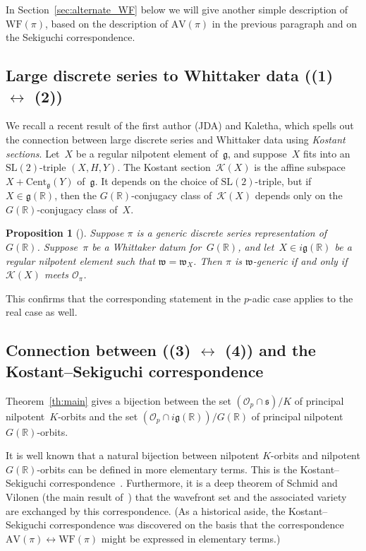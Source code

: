 \documentclass[10pt,leqno]{article}
\newtheorem{proposition}[equation]{Proposition}
\renewcommand{\O}{\mathcal O}
\newcommand{\R}{\mathbb R}
\newcommand{\g}{\mathfrak g}
\newcommand{\SL}{\text{SL}}
\newcommand{\s}{\mathfrak s}
\newcommand{\w}{\mathfrak w}
\newcommand{\AV}{\mathrm{AV}}
\newcommand{\WF}{\mathrm{WF}}
\newcommand{\Op}{\O_p}
\newcommand{\Kostant}[1]{\mathcal{K}(#1)}
\begin{document}
In Section~\ref{sec:alternate_WF} below we will  give another simple description of~$\WF(\pi)$, based on the description of $\AV(\pi)$ in the previous paragraph and on the Sekiguchi correspondence. 

\subsection{Large discrete series to Whittaker data ((1) $\leftrightarrow$ (2))}


We recall a recent result of the first author (JDA) and Kaletha, which spells out the connection between large discrete series and Whittaker data using  {\it Kostant sections}. Let~$X$ be a regular nilpotent element of~$\g$, and suppose~$X$ fits into an $\SL(2)$-triple $(X, H, Y)$. The Kostant section~$\Kostant{X}$ is the affine subspace $X + \mathrm{Cent}_{\g}(Y)$ of~$\g$. It depends on the choice of $\SL(2)$-triple, but if $X \in \g(\R)$, then the $G(\R)$-conjugacy class of~$\Kostant{X}$ depends only on the $G(\R)$-conjugacy class of~$X$. 


\begin{proposition}[\cite{adams_kaletha}]\label{JeffTasho_criterion}
Suppose $\pi$ is a generic discrete series representation of~$G(\R)$. Suppose~$\pi$ be a Whittaker datum for~$G(\R)$, and let~$X \in i\g(\R)$ be a regular nilpotent element such that $\w = \w_X$. 
Then $\pi$ is $\w$-generic if and only if $\Kostant{X}$ meets $\mathcal{O}_\pi$. 
\end{proposition}


This confirms that  the corresponding statement  in the $p$-adic case \cite{debacker_reeder_generic, kaletha_epipelagic}
applies to the real case as well.


\subsection{Connection between ((3) $\leftrightarrow$ (4)) and the Kostant--Sekiguchi correspondence } 

Theorem~\ref{th:main} gives a bijection between the set $(\Op \cap \s)/K$ of principal nilpotent~$K$-orbits and the set $(\Op \cap i\g(\R))/G(\R)$ of principal nilpotent~$G(\R)$-orbits. 

It is well known that a natural bijection between nilpotent $K$-orbits and nilpotent $G(\R)$-orbits can be defined in more elementary terms. This is the Kostant--Sekiguchi correspondence~\cite{sekiguchi}. Furthermore, it is a deep theorem of Schmid and Vilonen (the main result of~\cite{SV1}) that the wavefront set and the associated variety are exchanged by this correspondence. (As a historical aside, the Kostant--Sekiguchi correspondence was discovered on the basis that the correspondence $\AV(\pi) \leftrightarrow \WF(\pi)$ might be expressed in elementary terms.)
\end{document}
